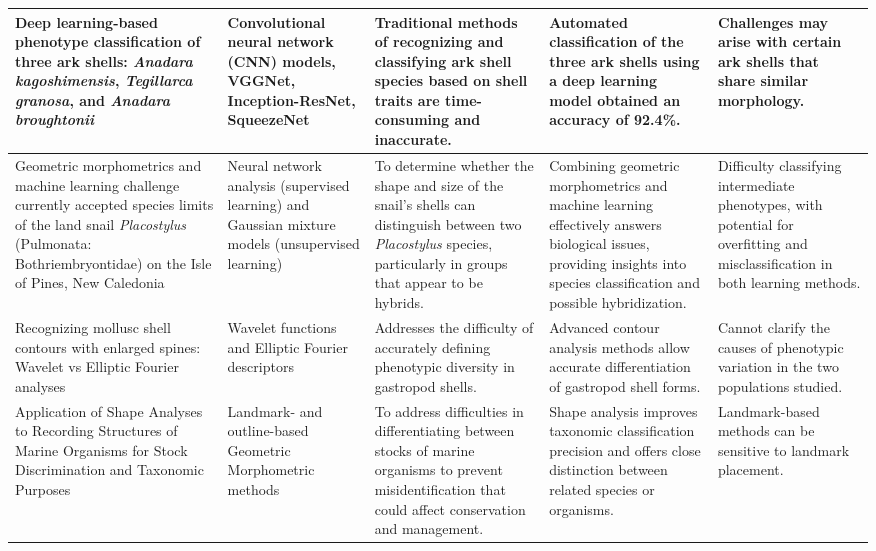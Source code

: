 \begin{landscape}
\begin{table}[]
\begin{adjustbox}{scale=0.5,center}
\begin{tabular}{|p{5cm}|p{5cm}|p{8cm}|p{8cm}|p{8cm}|}
		Deep learning-based phenotype classification of three ark shells: \textit{Anadara kagoshimensis}, \textit{Tegillarca granosa}, and \textit{Anadara broughtonii} &
		Convolutional neural network (CNN) models, VGGNet, Inception-ResNet, SqueezeNet &
		Traditional methods of recognizing and classifying ark shell species based on shell traits are time-consuming and inaccurate. &
		Automated classification of the three ark shells using a deep learning model obtained an accuracy of 92.4\%. &
		Challenges may arise with certain ark shells that share similar morphology. \\ \hline
		
		Geometric morphometrics and machine learning challenge currently accepted species limits of the land snail \textit{Placostylus} (Pulmonata: Bothriembryontidae) on the Isle of Pines, New Caledonia &
		Neural network analysis (supervised learning) and Gaussian mixture models (unsupervised learning) &
		To determine whether the shape and size of the snail’s shells can distinguish between two \textit{Placostylus} species, particularly in groups that appear to be hybrids. &
		Combining geometric morphometrics and machine learning effectively answers biological issues, providing insights into species classification and possible hybridization. &
		Difficulty classifying intermediate phenotypes, with potential for overfitting and misclassification in both learning methods. \\ \hline
		
		Recognizing mollusc shell contours with enlarged spines: Wavelet vs Elliptic Fourier analyses &
		Wavelet functions and Elliptic Fourier descriptors &
		Addresses the difficulty of accurately defining phenotypic diversity in gastropod shells. &
		Advanced contour analysis methods allow accurate differentiation of gastropod shell forms. &
		Cannot clarify the causes of phenotypic variation in the two populations studied. \\ \hline
		
		Application of Shape Analyses to Recording Structures of Marine Organisms for Stock Discrimination and Taxonomic Purposes &
		Landmark- and outline-based Geometric Morphometric methods &
		To address difficulties in differentiating between stocks of marine organisms to prevent misidentification that could affect conservation and management. &
		Shape analysis improves taxonomic classification precision and offers close distinction between related species or organisms. &
		Landmark-based methods can be sensitive to landmark placement. \\ \hline
		

\end{tabular}
\end{adjustbox}
\end{table}
\end{landscape}
